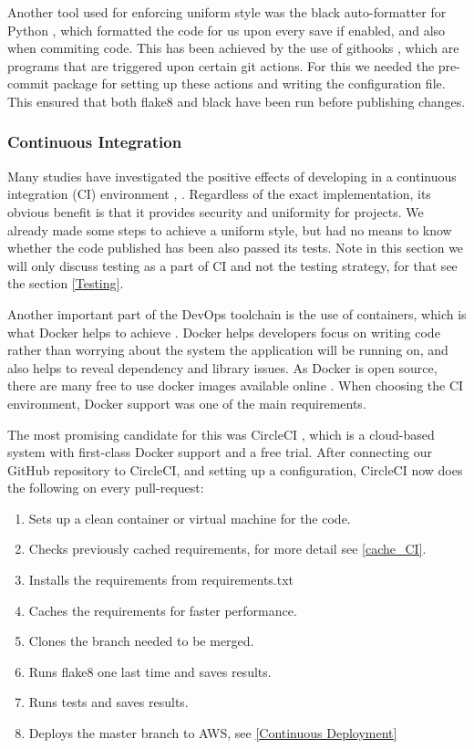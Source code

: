 \documentclass[main.tex]{subfiles}
\begin{document}
Another tool used for enforcing uniform style was the black auto-formatter for Python \cite{black}, which formatted the code for us upon every save if enabled, and also when commiting code. This has been achieved by the use of githooks \cite{githooks}, which are programs that are triggered upon certain git actions. For this we needed the pre-commit package for setting up these actions and writing the configuration file. This ensured that both flake8 and black have been run before publishing changes.

\subsubsection{Continuous Integration}
\label{Continuous Integration}

Many studies have investigated the positive effects of developing in a continuous integration (CI) environment \cite{CI_1}, \cite{CI_2}. Regardless of the exact implementation, its obvious benefit is that it provides security and uniformity for projects. We already made some steps to achieve a uniform style, but had no means to know whether the code published has been also passed its tests. Note in this section we will only discuss testing as a part of CI and not the testing strategy, for that see the section \ref{Testing}.

Another important part of the DevOps toolchain is the use of containers, which is what Docker helps to achieve \cite{Docker}. Docker helps developers focus on writing code rather than worrying about the system the application will be running on, and also helps to reveal dependency and library issues. As Docker is open source, there are many free to use docker images available online \cite{DockerImages}. When choosing the CI environment, Docker support was one of the main requirements.

The most promising candidate for this was CircleCI \cite{CircleCI}, which is a cloud-based system with first-class Docker support and a free trial. After connecting our GitHub repository to CircleCI, and setting up a configuration, CircleCI now does the following on every pull-request:

\begin{enumerate}
    \item Sets up a clean container or virtual machine for the code.
    \item Checks previously cached requirements, for more detail see \figurename{\ref{cache_CI}}.
    \item Installs the requirements from requirements.txt
    \item Caches the requirements for faster performance.
    \item Clones the branch needed to be merged.
    \item Runs flake8 one last time and saves results.
    \item Runs tests and saves results.
    \item Deploys the master branch to AWS, see \ref{Continuous Deployment}
\end{enumerate}
\end{document}
